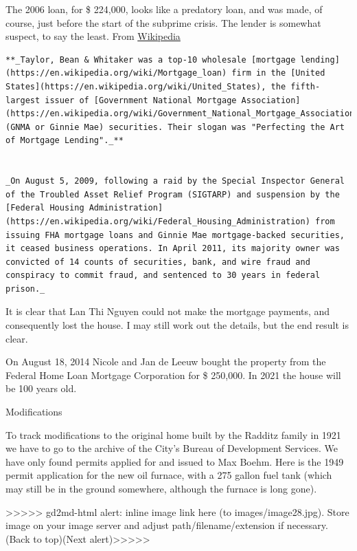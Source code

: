 \documentclass[
  12pt,
]{book}
\begin{document}
The 2006 loan, for \$ 224,000, looks like a predatory loan, and was made, of course, just before the start of the subprime crisis. The lender is somewhat suspect, to say the least. From \href{https://en.wikipedia.org/wiki/Taylor,_Bean_\%26_Whitaker}{Wikipedia}

\begin{verbatim}
**_Taylor, Bean & Whitaker was a top-10 wholesale [mortgage lending](https://en.wikipedia.org/wiki/Mortgage_loan) firm in the [United States](https://en.wikipedia.org/wiki/United_States), the fifth-largest issuer of [Government National Mortgage Association](https://en.wikipedia.org/wiki/Government_National_Mortgage_Association) (GNMA or Ginnie Mae) securities. Their slogan was "Perfecting the Art of Mortgage Lending"._**


_On August 5, 2009, following a raid by the Special Inspector General of the Troubled Asset Relief Program (SIGTARP) and suspension by the [Federal Housing Administration](https://en.wikipedia.org/wiki/Federal_Housing_Administration) from issuing FHA mortgage loans and Ginnie Mae mortgage-backed securities, it ceased business operations. In April 2011, its majority owner was convicted of 14 counts of securities, bank, and wire fraud and conspiracy to commit fraud, and sentenced to 30 years in federal prison._
\end{verbatim}

It is clear that Lan Thi Nguyen could not make the mortgage payments, and consequently lost the house. I may still work out the details, but the end result is clear.

On August 18, 2014 Nicole and Jan de Leeuw bought the property from the Federal Home Loan Mortgage Corporation for \$ 250,000. In 2021 the house will be 100 years old.

Modifications

To track modifications to the original home built by the Radditz family in 1921 we have to go to the archive of the City's Bureau of Development Services. We have only found permits applied for and issued to Max Boehm. Here is the 1949 permit application for the new oil furnace, with a 275 gallon fuel tank (which may still be in the ground somewhere, although the furnace is long gone).

{\textgreater\textgreater\textgreater\textgreater\textgreater{} gd2md-html alert: inline image link here (to images/image28.jpg). Store image on your image server and adjust path/filename/extension if necessary. }(Back to top)(Next alert){\textgreater\textgreater\textgreater\textgreater\textgreater{} }
\end{document}
